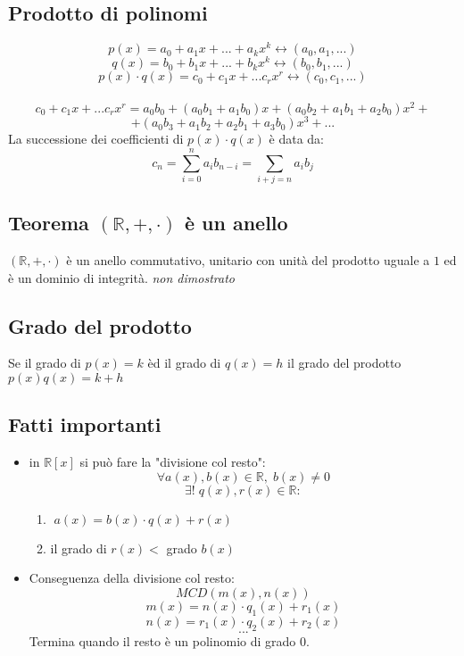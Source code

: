 \subsection{Prodotto di polinomi}
\[p(x)=a_0+a_1x+...+a_kx^k\leftrightarrow (a_0,a_1,...)\]
\[q(x)=b_0+b_1x+...+b_kx^k\leftrightarrow (b_0,b_1,...)\]
\[p(x)\cdot q(x)=c_0+c_1x+...c_rx^r\leftrightarrow (c_0,c_1,...)\]
\\
\[c_0+c_1x+...c_rx^r= a_0b_0+(a_0b_1+a_1b_0)x+(a_0b_2+a_1b_1+a_2b_0)x^2+\]
\[+(a_0b_3+a_1b_2+a_2b_1+a_3b_0)x^3+...\]
La successione dei coefficienti di \(p(x)\cdot q(x)\) è data da:
\[c_n= \sum^n_{i=0}a_ib_{n-i}=\sum_{i+j=n}a_ib_j\]


\subsection{Teorema \((\mathbb{R},+,\cdot)\) è un anello}
\((\mathbb{R},+,\cdot)\) è un anello commutativo, unitario con unità del prodotto uguale a \(1\) ed è un dominio di integrità.
\textit{non dimostrato}

\subsection{Grado del prodotto}
Se il grado di \(p(x)=k\) èd il grado di \(q(x)=h\) il grado del prodotto \(p(x)q(x)=k+h\)

\subsection{Fatti importanti}
\begin{itemize}

	\item in \(\mathbb{R}[x]\) si può fare la "divisione col resto":
	\[\forall a(x),b(x)\in\mathbb{R},\; b(x)\neq 0\]
	\[\exists !\; q(x),r(x)\in\mathbb{R}:\]

	\begin{enumerate}
		\item \(\;a(x)=b(x)\cdot q(x)+r(x)\)
		\item il grado di \(r(x)<\) grado \(b(x)\)
	\end{enumerate}

	\item Conseguenza della divisione col resto:
	\[MCD(m(x),n(x))\]
	\[m(x)=n(x)\cdot q_1(x)+r_1(x)\]
	\[n(x)=r_1(x)\cdot q_2(x)+r_2(x)\]
	\[...\]
	Termina quando il resto è un polinomio di grado \(0\).

\end{itemize}

